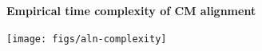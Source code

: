 \documentclass[landscape]{slides}
\begin{document}
%
\begin{slide}
\begin{center}
\textbf{Empirical time complexity of CM alignment}

\texttt{[image: figs/aln-complexity]}

\vfill
\end{center}
\end{slide}
\end{document}

